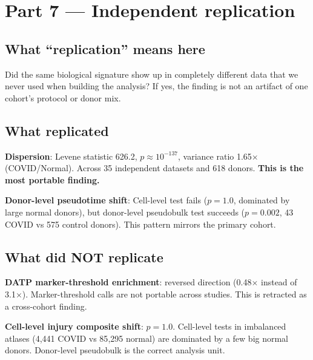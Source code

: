 \documentclass[11pt]{article}
\begin{document}
\section{Part 7 --- Independent replication}

\subsection{What ``replication'' means here}

Did the same biological signature show up in completely different data that we never used when building the analysis? If yes, the finding is not an artifact of one cohort's protocol or donor mix.

\subsection{What replicated}

\begin{resultbox}
\textbf{Dispersion}: Levene statistic 626.2, $p \approx 10^{-137}$, variance ratio 1.65$\times$ (COVID/Normal). Across 35 independent datasets and 618 donors. \textbf{This is the most portable finding.}
\end{resultbox}

\begin{resultbox}
\textbf{Donor-level pseudotime shift}: Cell-level test fails ($p = 1.0$, dominated by large normal donors), but donor-level pseudobulk test succeeds ($p = 0.002$, 43 COVID vs 575 control donors). This pattern mirrors the primary cohort.
\end{resultbox}

\subsection{What did NOT replicate}

\begin{pitfall}
\textbf{DATP marker-threshold enrichment}: reversed direction (0.48$\times$ instead of 3.1$\times$). Marker-threshold calls are not portable across studies. This is retracted as a cross-cohort finding.
\end{pitfall}

\begin{pitfall}
\textbf{Cell-level injury composite shift}: $p = 1.0$. Cell-level tests in imbalanced atlases (4{,}441 COVID vs 85{,}295 normal) are dominated by a few big normal donors. Donor-level pseudobulk is the correct analysis unit.
\end{pitfall}
\end{document}
